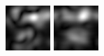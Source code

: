 \begin{figure}[ht]
\begin{center}
 \includegraphics[width=\columnwidth/9]{ch4/figures/mag_1_3.jpg}
 \includegraphics[width=\columnwidth/9]{ch4/figures/mag_1_4.jpg}

\end{center}
\end{figure}
